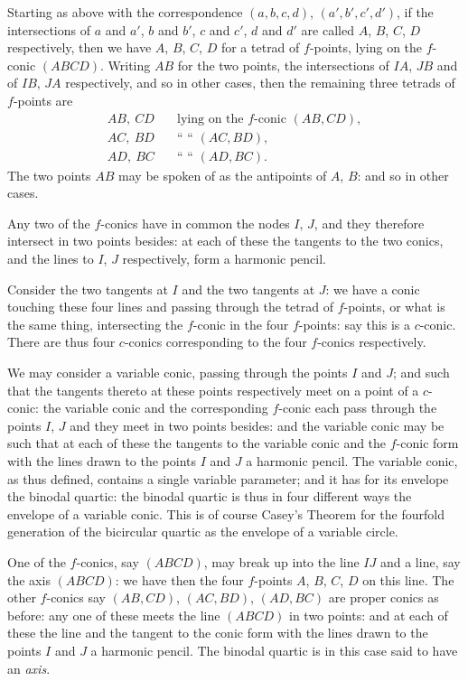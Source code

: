 \documentclass[11pt,a4paper]{book}
\begin{document}
Starting as above with the correspondence $(a, b, c, d)$, $(a', b', c', d')$, if the intersections of $a$ and $a'$, $b$ and $b'$, $c$ and $c'$, $d$ and $d'$ are called $A$, $B$, $C$, $D$ respectively, then we have $A$, $B$, $C$, $D$ for a tetrad of $f$-points, lying on the $f$-conic $(ABCD)$. Writing $AB$ for the two points, the intersections of $IA$, $JB$ and of $IB$, $JA$ respectively, and so in other cases, then the remaining three tetrads of $f$-points are
\begin{align*}
AB,\ CD &\quad \text{lying on the $f$-conic } (AB, CD),\\
AC,\ BD &\quad \text{`` `` } (AC, BD),\\
AD,\ BC &\quad \text{`` `` } (AD, BC).
\end{align*}
The two points $AB$ may be spoken of as the antipoints of $A$, $B$: and so in other cases.

Any two of the $f$-conics have in common the nodes $I$, $J$, and they therefore intersect in two points besides: at each of these the tangents to the two conics, and the lines to $I$, $J$ respectively, form a harmonic pencil.

Consider the two tangents at $I$ and the two tangents at $J$: we have a conic touching these four lines and passing through the tetrad of $f$-points, or what is the same thing, intersecting the $f$-conic in the four $f$-points: say this is a $c$-conic. There are thus four $c$-conics corresponding to the four $f$-conics respectively.

We may consider a variable conic, passing through the points $I$ and $J$; and such that the tangents thereto at these points respectively meet on a point of a $c$-conic: the variable conic and the corresponding $f$-conic each pass through the points $I$, $J$ and they meet in two points besides: and the variable conic may be such that at each of these the tangents to the variable conic and the $f$-conic form with the lines drawn to the points $I$ and $J$ a harmonic pencil. The variable conic, as thus defined, contains a single variable parameter; and it has for its envelope the binodal quartic: the binodal quartic is thus in four different ways the envelope of a variable conic. This is of course Casey's Theorem for the fourfold generation of the bicircular quartic as the envelope of a variable circle.

One of the $f$-conics, say $(ABCD)$, may break up into the line $IJ$ and a line, say the axis $(ABCD)$: we have then the four $f$-points $A$, $B$, $C$, $D$ on this line. The other $f$-conics say $(AB, CD)$, $(AC, BD)$, $(AD, BC)$ are proper conics as before: any one of these meets the line $(ABCD)$ in two points: and at each of these the line and the tangent to the conic form with the lines drawn to the points $I$ and $J$ a harmonic pencil. The binodal quartic is in this case said to have an \emph{axis}.
\end{document}
